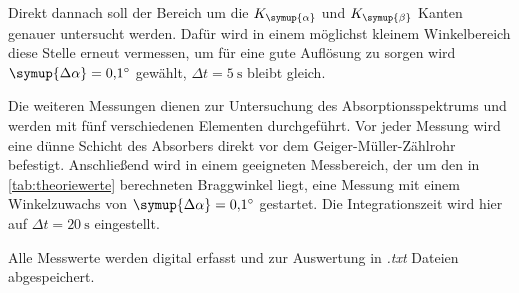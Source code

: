 Direkt dannach soll der Bereich um die $K_{\symup{\alpha}}$ und $K_{\symup{\beta}}$ Kanten genauer untersucht werden.
Dafür wird in einem möglichst kleinem Winkelbereich diese Stelle erneut vermessen, um für eine gute Auflösung
zu sorgen wird $\symup{\Delta\alpha}=\qty{0.1}{\degree}$ gewählt, $\Delta t=\qty{5}{\second}$ bleibt gleich.

Die weiteren Messungen dienen zur Untersuchung des Absorptionsspektrums und werden mit fünf verschiedenen
Elementen durchgeführt.
Vor jeder Messung wird eine dünne Schicht des Absorbers direkt vor dem Geiger-Müller-Zählrohr befestigt.
Anschließend wird in einem geeigneten Messbereich, der um den in \autoref{tab:theoriewerte} berechneten Braggwinkel liegt,
eine Messung mit einem Winkelzuwachs von $\symup{\Delta\alpha}=\qty{0.1}{\degree}$ gestartet.
Die Integrationszeit wird hier auf $\Delta t=\qty{20}{\second}$ eingestellt.

Alle Messwerte werden digital erfasst und zur Auswertung in \textit{.txt} Dateien abgespeichert.